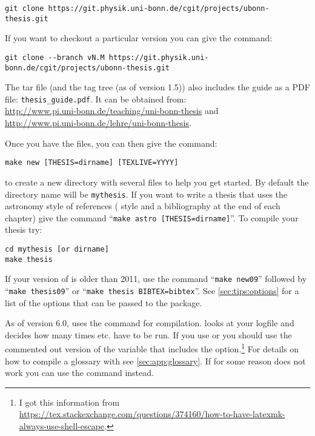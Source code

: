 {\small\begin{verbatim}
git clone https://git.physik.uni-bonn.de/cgit/projects/ubonn-thesis.git
\end{verbatim}}
\noindent
If you want to checkout a particular version you can give the command:
{\small\begin{verbatim}
git clone --branch vN.M https://git.physik.uni-bonn.de/cgit/projects/ubonn-thesis.git
\end{verbatim}}
\noindent
The tar file (and the tag tree (as of version 1.5)) also includes
the guide as a PDF file: \texttt{thesis\_guide.pdf}.  It can be
obtained from:\\
\url{http://www.pi.uni-bonn.de/teaching/uni-bonn-thesis}
and\\
\url{http://www.pi.uni-bonn.de/lehre/uni-bonn-thesis}.

\par\noindent
Once you have the files, you can then give the command:
\begin{verbatim}
make new [THESIS=dirname] [TEXLIVE=YYYY]
\end{verbatim}
to create a new directory with several files to help you get
started. By default the directory name will be \texttt{mythesis}.
If you want to write a thesis that uses the astronomy style of references
( style and a bibliography at the end of each chapter)
give the command \enquote{\texttt{make astro [THESIS=dirname]}}.
To compile your thesis try:
\begin{verbatim}
cd mythesis [or dirname]
make thesis
\end{verbatim}
If your version of \TeXLive is older than 2011, use the command \enquote{\texttt{make new09}}
followed by \enquote{\texttt{make thesis09}}
or \enquote{\texttt{make thesis BIBTEX=bibtex}}.
See \cref{sec:tips:options} for a list of the options that can be passed to the package.

As of version 6.0,  uses the  command for compilation.
 looks at your logfile and decides how many times  etc.
have to be run.
If you use  or  you should use the commented out version
of the  variable that includes the  option.\footnote{%
  I got this information from \url{https://tex.stackexchange.com/questions/374160/how-to-have-latexmk-always-use-shell-escape}.}
For details on how to compile a glossary with  see \cref{sec:app:glossary}.
If for some reason  does not work you can use the command
 instead.

